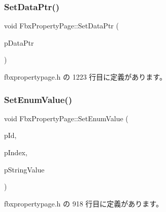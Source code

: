 \subsubsection{\texorpdfstring{Set\+Data\+Ptr()}{SetDataPtr()}}
{\footnotesize\ttfamily void Fbx\+Property\+Page\+::\+Set\+Data\+Ptr (\begin{DoxyParamCaption}\item[{void $\ast$}]{p\+Data\+Ptr }\end{DoxyParamCaption})\hspace{0.3cm}{\ttfamily [inline]}}



 fbxpropertypage.\+h の 1223 行目に定義があります。

\mbox{\label{class_fbx_property_page_ab1feda794f3e03401945ba60f7216f1c}} 
\subsubsection{\texorpdfstring{Set\+Enum\+Value()}{SetEnumValue()}}
{\footnotesize\ttfamily void Fbx\+Property\+Page\+::\+Set\+Enum\+Value (\begin{DoxyParamCaption}\item[{\hyperlink{fbxtypes_8h_a088fa96de3b0b3ea69f0f6afef525dfb}{Fbx\+Int}}]{p\+Id,  }\item[{int}]{p\+Index,  }\item[{const char $\ast$}]{p\+String\+Value }\end{DoxyParamCaption})\hspace{0.3cm}{\ttfamily [inline]}}



 fbxpropertypage.\+h の 918 行目に定義があります。

\mbox{\label{class_fbx_property_page_a34e74fbbf03330b4eab318261520f2bc}} 
